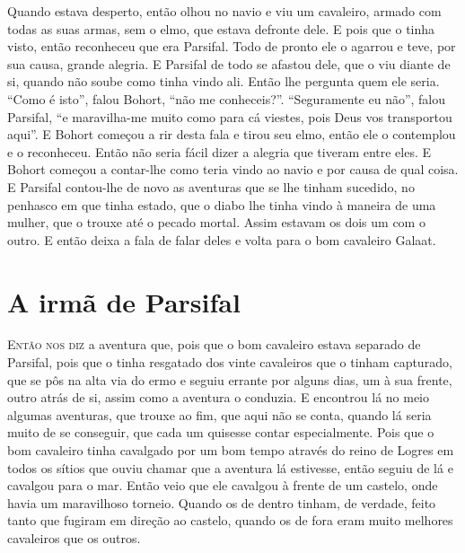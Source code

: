 Quando estava desperto, então olhou no navio e viu um cavaleiro, armado com
todas as suas armas, sem o elmo, que estava defronte dele. E pois que o tinha
visto, então reconheceu que era Parsifal. Todo de pronto ele o agarrou e teve,
por sua causa, grande alegria. E Parsifal de todo se afastou dele, que o viu
diante de si, quando não soube como tinha vindo ali. Então lhe pergunta quem
ele seria. “Como é isto”, falou Bohort, “não me conheceis?”. “Seguramente eu
não”, falou Parsifal, “e maravilha-me muito como para cá viestes, pois Deus
vos transportou aqui”. E Bohort começou a rir desta fala e tirou seu elmo,
então ele o contemplou e o reconheceu. Então não seria fácil dizer a alegria
que tiveram entre eles. E Bohort começou a contar-lhe como teria vindo ao navio
e por causa de qual coisa. E Parsifal contou-lhe de novo as aventuras que se
lhe tinham sucedido, no penhasco em que tinha estado, que o diabo lhe tinha
vindo à maneira de uma mulher, que o trouxe até o pecado mortal. Assim estavam
os dois um com o outro. E então deixa a fala de falar deles e volta para o bom
cavaleiro Galaat.

\chapter{A irmã de Parsifal}

E\textsc{ntão nos diz} a aventura que, pois que o bom cavaleiro estava separado de
Parsifal, pois que o tinha resgatado dos vinte cavaleiros que o tinham
capturado, que se pôs na alta via do ermo e seguiu errante por alguns dias, um
à sua frente, outro atrás de si, assim como a aventura o conduzia. E
encontrou lá no meio algumas aventuras, que trouxe ao fim, que aqui não se
conta, quando lá seria muito de se conseguir, que cada um quisesse contar
especialmente. Pois que o bom cavaleiro tinha cavalgado por um bom tempo
através do reino de Logres em todos os sítios que ouviu chamar que a aventura
lá estivesse, então seguiu de lá e cavalgou para o mar. Então veio que ele
cavalgou à frente de um castelo, onde havia um maravilhoso torneio. Quando os
de dentro tinham, de verdade, feito tanto que fugiram em direção ao castelo,
quando os de fora eram muito melhores cavaleiros que os outros. 

